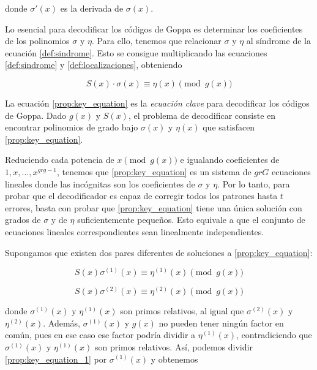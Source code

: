 donde $\sigma'(x)$ es la derivada de $\sigma(x)$.

Lo esencial para decodificar los códigos de Goppa es determinar los coeficientes de los polinomios $\sigma$ y $\eta$. Para ello, tenemos que relacionar $\sigma$ y $\eta$ al síndrome de la ecuación \ref{def:sindrome}. Esto se consigue multiplicando las ecuaciones \ref{def:sindrome} y \ref{def:localizaciones}, obteniendo

\begin{equation}
    \label{prop:key_equation}
    S(x) \cdot \sigma(x) \equiv \eta(x) \pmod{g(x)}
\end{equation}

La ecuación \ref{prop:key_equation} es la \emph{ecuación clave} para decodificar los códigos de Goppa. Dado $g(x)$ y $S(x)$, el problema de decodificar consiste en encontrar polinomios de grado bajo $\sigma(x)$ y $\eta(x)$ que satisfacen \ref{prop:key_equation}.

Reduciendo cada potencia de $x \pmod{g(x)}$ e igualando coeficientes de $1, x, ..., x^{gr g - 1}$, tenemos que \ref{prop:key_equation} es un sistema de $gr G$ ecuaciones lineales donde las incógnitas son los coeficientes de $\sigma$ y $\eta$. Por lo tanto, para probar que el decodificador es capaz de corregir todos los patrones hasta $t$ errores, basta con probar que \ref{prop:key_equation} tiene una única solución con grados de $\sigma$ y de $\eta$ suficientemente pequeños. Esto equivale a que el conjunto de ecuaciones lineales correspondientes sean linealmente independientes.

Supongamos que existen dos pares diferentes de soluciones a \ref{prop:key_equation}:

\begin{equation}
    \label{prop:key_equation_1}
    S(x) \sigma^{(1)}(x) \equiv \eta^{(1)}(x) \pmod{g(x)}
\end{equation}

\begin{equation}
    \label{prop:key_equation_2}
    S(x) \sigma^{(2)}(x) \equiv \eta^{(2)}(x) \pmod{g(x)}
\end{equation}

donde $\sigma^{(1)}(x)$ y $\eta^{(1)}(x)$ son primos relativos, al igual que $\sigma^{(2)}(x)$ y $\eta^{(2)}(x)$. Además, $\sigma^{(1)}(x)$ y $g(x)$ no pueden tener ningún factor en común, pues en ese caso ese factor podría dividir a $\eta^{(1)}(x)$, contradiciendo que $\sigma^{(1)}(x)$ y $\eta^{(1)}(x)$ son primos relativos. Así, podemos dividir \ref{prop:key_equation_1} por $\sigma^{(1)}(x)$ y obtenemos

